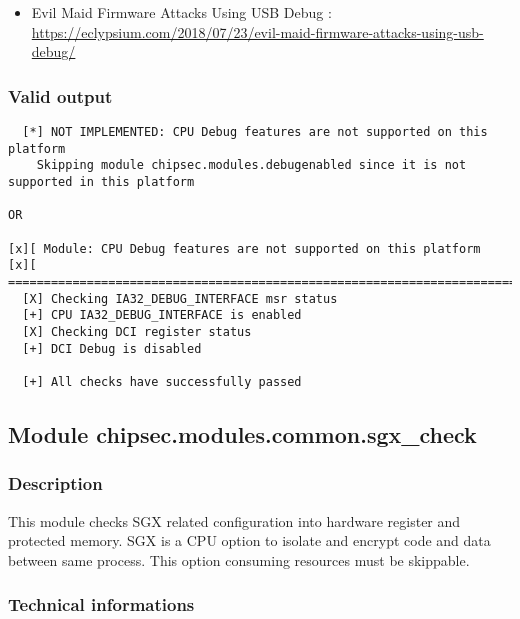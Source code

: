 \begin{itemize}
\tightlist
\item
  Evil Maid Firmware Attacks Using USB Debug :
  \url{https://eclypsium.com/2018/07/23/evil-maid-firmware-attacks-using-usb-debug/}
\end{itemize}

\hypertarget{valid-output-21}{%
\subsubsection{Valid output}\label{valid-output-21}}

\begin{verbatim}
  [*] NOT IMPLEMENTED: CPU Debug features are not supported on this platform
    Skipping module chipsec.modules.debugenabled since it is not supported in this platform

OR

[x][ Module: CPU Debug features are not supported on this platform
[x][ =======================================================================
  [X] Checking IA32_DEBUG_INTERFACE msr status
  [+] CPU IA32_DEBUG_INTERFACE is enabled
  [X] Checking DCI register status
  [+] DCI Debug is disabled

  [+] All checks have successfully passed
\end{verbatim}

\hypertarget{module-chipsec.modules.common.sgx_check}{%
\subsection{Module
chipsec.modules.common.sgx\_check}\label{module-chipsec.modules.common.sgx_check}}

\hypertarget{description-22}{%
\subsubsection{Description}\label{description-22}}

This module checks SGX related configuration into hardware register and
protected memory. SGX is a CPU option to isolate and encrypt code and
data between same process. This option consuming resources must be
skippable.

\hypertarget{technical-informations-21}{%
\subsubsection{Technical informations}\label{technical-informations-21}}


